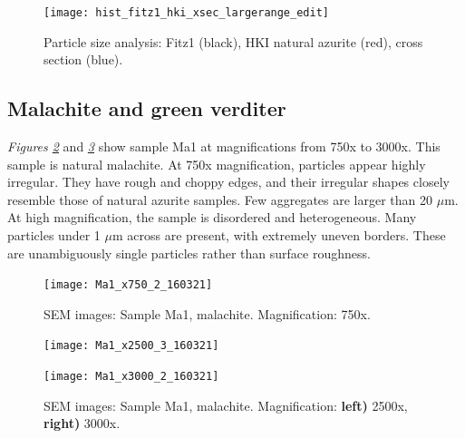 \begin{figure}[H]
\centering
  \texttt{[image: hist\_fitz1\_hki\_xsec\_largerange\_edit]}
\caption[Particle size analysis: HKI natural azurite, Fitz1, cross section]{Particle size analysis: Fitz1 (black), HKI natural azurite (red), cross section (blue).} 
\label{fig:hist_all}
\end{figure}




\subsection[Malachite and green verditer]{Malachite and green verditer}
\label{subsection3.1.2}


\textit{Figures \ref{fig:Ma1_sem_1}} and \textit{\ref{fig:Ma1_sem_2}} show sample Ma1 at magnifications from 750x to 3000x. This sample is natural malachite. At 750x magnification, particles appear highly irregular. They have rough and choppy edges, and their irregular shapes closely resemble those of natural azurite samples. Few aggregates are larger than 20 $\mu$m. At high magnification, the sample is disordered and heterogeneous. Many particles under 1 $\mu$m across are present, with extremely uneven borders. These are unambiguously single particles rather than surface roughness.

\begin{figure}[H]
\centering
\texttt{[image: Ma1\_x750\_2\_160321]}
\caption[SEM images: Sample Ma1, malachite]{SEM images: Sample Ma1, malachite. Magnification: 750x.}
\label{fig:Ma1_sem_1}
\end{figure}

\begin{figure}[H]
\centering
\begin{minipage}{.45\textwidth}
  \centering
  \texttt{[image: Ma1\_x2500\_3\_160321]}
\end{minipage}
\begin{minipage}{.45\textwidth}
  \centering
  \texttt{[image: Ma1\_x3000\_2\_160321]}
\end{minipage}
\caption[SEM images: Sample Ma1, malachite]{SEM images: Sample Ma1, malachite. Magnification: \textbf{left)} 2500x, \textbf{right)} 3000x.}
\label{fig:Ma1_sem_2}
\end{figure}

